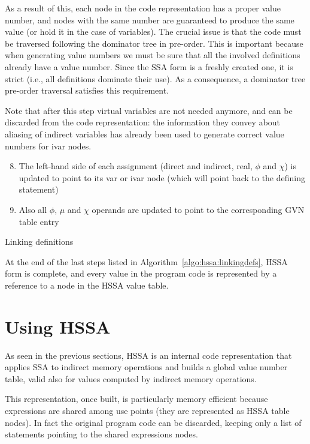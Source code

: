 As a result of this, each node in the code representation has a proper value number, and nodes with the same number are guaranteed to produce the same value (or hold it in the case of variables).
The crucial issue is that the code must be traversed following the dominator tree in pre-order. This is important because when generating value numbers we must be sure that all the involved definitions already have a value number. Since the SSA form is a freshly created one, it is strict (i.e., all definitions dominate their use). As a consequence, a dominator tree pre-order traversal satisfies this requirement.

Note that after this step virtual variables are not needed anymore, and can be discarded from the code representation: the information they convey about aliasing of indirect variables has already been used to generate correct value numbers for ivar nodes.

\begin{algorithm}[H]
\begin{enumerate}
\setcounter{enumi}{7}
  \item The left-hand side of each assignment (direct and indirect, real, $\phi$ and $\chi$) is updated to point to its var or ivar node (which will point back to the defining statement)
  \item Also all $\phi$, $\mu$ and $\chi$ operands are updated to point to the corresponding GVN table entry
\end{enumerate}
\caption{\label{algo:hssa:linkingdefs}Linking definitions}
\end{algorithm}

At the end of the last steps listed in Algorithm~\ref{algo:hssa:linkingdefs}, HSSA form is complete, and every value in the program code is represented by a reference to a node in the HSSA value table.

\section{Using HSSA}
As seen in the previous sections, HSSA is an internal code representation that applies SSA to indirect memory operations and builds a global value number table, valid also for values computed by indirect memory operations.


This representation, once built, is particularly memory efficient because expressions are shared among use points (they are represented as HSSA table nodes). In fact the original program code can be discarded, keeping only a list of statements pointing to the shared expressions nodes.

